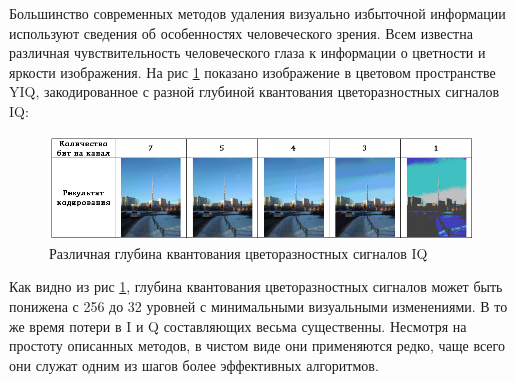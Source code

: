 Большинство современных методов удаления визуально избыточной информации используют сведения об особенностях человеческого зрения. Всем известна различная чувствительность человеческого глаза к информации о цветности и яркости изображения. На рис \ref{pic:quantization} показано изображение в цветовом пространстве YIQ, закодированное с разной глубиной квантования цветоразностных сигналов IQ:
\begin{figure}[H]
	\begin{center}
		\includegraphics[scale=0.75]{pics/quantization/quantization.png}
		\caption{Различная глубина квантования цветоразностных сигналов IQ} 
		\label{pic:quantization}
	\end{center}
\end{figure}
Как видно из рис \ref{pic:quantization}, глубина квантования цветоразностных сигналов может быть понижена с 256 до 32 уровней с минимальными визуальными изменениями. В то же время потери в I и Q составляющих весьма существенны. Несмотря на простоту описанных методов, в чистом виде они применяются редко, чаще всего они служат одним из шагов более эффективных алгоритмов.

